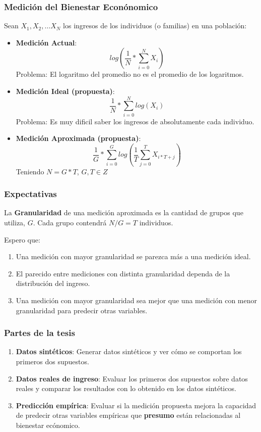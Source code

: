 \documentclass[10pt,mathserif]{beamer}%
\begin{document}
\begin{frame}
\frametitle{Medición del Bienestar Econónomico}
    Sean $X_1, X_2, \dots X_N$ los ingresos de los individuos (o familias) en una población:
    \begin{itemize}
        \item \textbf{Medición Actual}: 
        $$ 
        log(\frac{1}{N} * \sum_{i=0}^N X_i)
        $$
        Problema: El logaritmo del promedio no es el promedio de los logaritmos.
        \pause
        \item \textbf{Medición Ideal (propuesta)}:
        $$
        \frac{1}{N} * \sum_{i=0}^N log(X_i)
        $$
        Problema: Es muy dificil saber los ingresos de absolutamente cada individuo.
        \pause
        \item \textbf{Medición Aproximada (propuesta)}:
        $$
        \frac{1}{G} * \sum_{i=0}^G log(\frac{1}{T} \sum_{j = 0}^{T} X_{i*T+j})
        $$
        Teniendo $N = G * T$, $G, T \in Z$
    \end{itemize}
\end{frame}

\begin{frame}
    \frametitle{Expectativas}
    \begin{definition}[Granularidad]
        La \textbf{Granularidad} de una medición aproximada es la cantidad de grupos que utiliza, $G$.
        Cada grupo contendrá $N/G = T$ individuos.
    \end{definition}

    Espero que:
    \pause
    \begin{enumerate}
        \item Una medición con mayor granularidad se parezca más a una medición ideal. 
        \pause
        \item El parecido entre mediciones con distinta granularidad dependa de la distribución del ingreso.
        \pause 
        \item Una medición con mayor granularidad sea mejor que una medición con menor granularidad para predecir otras variables.
    \end{enumerate}

\end{frame}

\begin{frame}
    \frametitle{Partes de la tesis}
    \begin{enumerate}
        \item \textbf{Datos sintéticos}: Generar datos sintéticos y ver cómo se comportan los primeros dos supuestos.
        \item \textbf{Datos reales de ingreso}: Evaluar los primeros dos supuestos sobre datos reales y comparar los resultados con lo obtenido en los datos sintéticos.
        \item \textbf{Predicción empírica}: Evaluar si la medición propuesta mejora la capacidad de predecir otras variables empíricas que \textbf{presumo} están relacionadas al bienestar ecónomico.
    \end{enumerate}
\end{frame}
\end{document}
